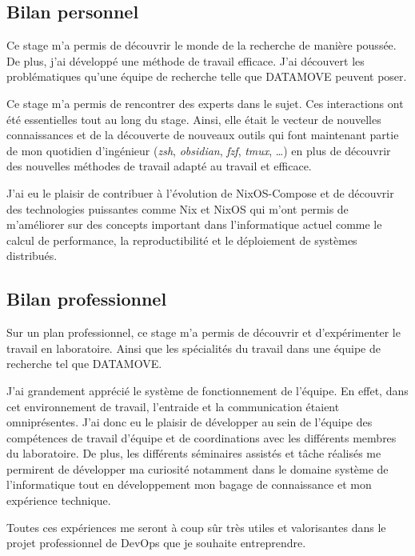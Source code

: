 \documentclass[a4paper,french,12pt, titlepage]{article}
\begin{document}
\hypertarget{bilan-personnel}{%
\subsection{Bilan personnel}\label{bilan-personnel}}

Ce stage m'a permis de découvrir le monde de la recherche de manière
poussée. De plus, j'ai développé une méthode de travail efficace. J'ai
découvert les problématiques qu'une équipe de recherche telle que
DATAMOVE peuvent poser.

Ce stage m'a permis de rencontrer des experts dans le sujet. Ces
interactions ont été essentielles tout au long du stage. Ainsi, elle
était le vecteur de nouvelles connaissances et de la découverte de
nouveaux outils qui font maintenant partie de mon quotidien d'ingénieur
(\emph{zsh}, \emph{obsidian}, \emph{fzf}, \emph{tmux}, \ldots) en plus
de découvrir des nouvelles méthodes de travail adapté au travail et
efficace.

J'ai eu le plaisir de contribuer à l'évolution de NixOS-Compose et de
découvrir des technologies puissantes comme Nix et NixOS qui m'ont
permis de m'améliorer sur des concepts important dans l'informatique
actuel comme le calcul de performance, la reproductibilité et le
déploiement de systèmes distribués.

\hypertarget{bilan-professionnel}{%
\subsection{Bilan professionnel}\label{bilan-professionnel}}

Sur un plan professionnel, ce stage m'a permis de découvrir et
d'expérimenter le travail en laboratoire. Ainsi que les spécialités du
travail dans une équipe de recherche tel que DATAMOVE.

J'ai grandement apprécié le système de fonctionnement de l'équipe. En
effet, dans cet environnement de travail, l'entraide et la communication
étaient omniprésentes. J'ai donc eu le plaisir de développer au sein de
l'équipe des compétences de travail d'équipe et de coordinations avec
les différents membres du laboratoire. De plus, les différents
séminaires assistés et tâche réalisés me permirent de développer ma
curiosité notamment dans le domaine système de l'informatique tout en
développement mon bagage de connaissance et mon expérience technique.

Toutes ces expériences me seront à coup sûr très utiles et valorisantes
dans le projet professionnel de DevOps que je souhaite entreprendre.
\end{document}
